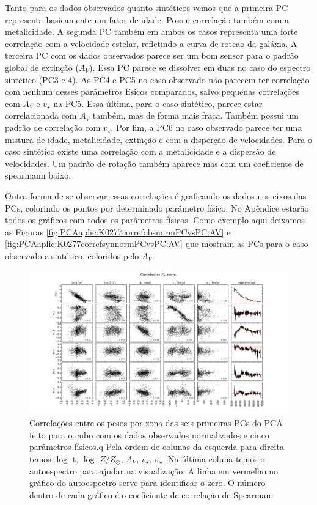 Tanto
para os dados observados quanto sintéticos vemos que a primeira PC representa basicamente um fator de idade. Possui
correlação também com a metalicidade. A segunda PC também em ambos os casos representa uma forte correlação com a
velocidade estelar, refletindo a curva de rotcao da galáxia. A terceira PC com os dados observados parece ser um bom sensor para o padrão global de extinção
($A_V$). Essa PC parece se dissolver em duas no caso do espectro sintético (PC3 e 4). As PC4 e PC5 no caso observado não
parecem ter correlação com nenhum desses parâmetros físicos comparados, salvo pequenas correlações com $A_V$ e $v_\star$
na PC5. Essa última, para o caso sintético, parece estar correlacionada com $A_V$ também, mas de forma mais fraca.
Também possui um padrão de correlação com $v_\star$. Por fim, a PC6 no caso observado parece ter uma mistura de idade,
metalicidade, extinção e com a disperção de velocidades. Para o caso sintético existe uma correlação com a metalicidade
e a dispersão de velocidades. Um padrão de rotação também aparece mas com um coeficiente de spearmann baixo.

Outra forma de se observar essas correlações é graficando os dados nos eixos das PCs, colorindo os pontos por
determinado parâmetro físico. No Apêndice estarão todos os gráficos com todos os parâmetros físicos. Como exemplo aqui
deixamos as Figuras \ref{fig:PCAaplic:K0277correfobsnormPCvsPC:AV} e \ref{fig:PCAaplic:K0277correfsynnormPCvsPC:AV} que mostram
as PCs para o caso observado e sintético, coloridos pelo $A_V$.

\begin{figure}
    \includegraphics[width=1.3\textwidth, angle=-90]{figuras/K0277-correl-f_obs_norm-PCvsPhys.pdf}
	\caption[Correlações PCs vs. par\^ametros f\'isicos - $F_{obs}$ norm.]
    {Correlações entre os pesos por zona das seis primeiras PCs do PCA feito para o cubo com os dados observados
    normalizados e cinco parâmetros físicos.q Pela ordem de colunas da esquerda para direita temos $\log$ t, $\log$ $Z /
    Z_{\odot}$, $A_V$, $v_{\star}$, $\sigma_{\star}$. Na última coluna temos o autoespectro para ajudar na visualização.
    A linha em vermelho no gráfico do autoespectro serve para identificar o zero. O número dentro de cada gráfico é o
    coeficiente de correlação de Spearman.}
    \label{fig:PCAaplic:K0277correfobsnorm}
\end{figure}

